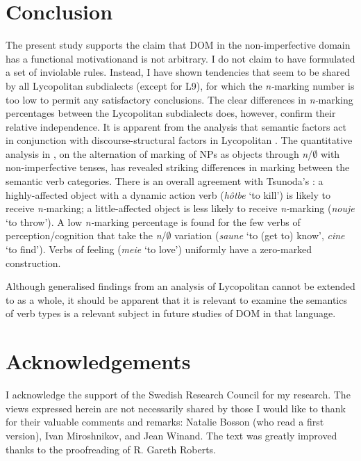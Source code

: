 \documentclass[output=paper]{LSP/langsci}
\begin{document}
\section{Conclusion}\label{06-en-sec:7}

The present study supports the claim that  DOM in the non-imperfective domain has a functional motivationand is not arbitrary. I do not claim to have formulated a set of inviolable rules. Instead, I have shown tendencies that seem to be shared by all Lycopolitan subdialects (except for L9), for which the \textit{n-}marking number is too low to permit any satisfactory conclusions. The clear differences in \textit{n-}marking percentages between the Lycopolitan subdialects does, however, confirm their relative independence. It is apparent from the analysis that semantic factors act in conjunction with discourse-structural factors in Lycopolitan . The quantitative analysis in , on the alternation of marking of NPs as objects through \textit{n}/${\emptyset}$ with non-imperfective tenses, has revealed striking differences in marking between the semantic verb categories. There is an overall agreement with Tsunoda’s : a highly-affected object with a dynamic action verb (\eg \textit{hôtbe} ‘to kill’) is likely to receive \textit{n-}marking; a little-affected object is less likely to receive \textit{n-}marking (\eg \textit{nouje} ‘to throw’). A low \textit{n-}marking percentage is found for the few verbs of perception/cognition that take the \textit{n}/${\emptyset}$ variation (\textit{saune} ‘to (get to) know’, \textit{cine} ‘to find’). Verbs of feeling (\eg \textit{meie} ‘to love’) uniformly have a zero-marked construction. 

Although generalised findings from an analysis of Lycopolitan cannot be extended to  as a whole, it should be apparent that it is relevant to examine the semantics of verb types is a relevant subject in future studies of DOM in that language. 

\section*{Acknowledgements}

I acknowledge the support of the Swedish Research Council for my research. The views expressed herein are not necessarily shared by those I would like to thank for their valuable comments and remarks: Natalie Bosson (who read a first version), Ivan Miroshnikov, and Jean Winand. The text was greatly improved thanks to the proofreading of R. Gareth Roberts.
\end{document}

